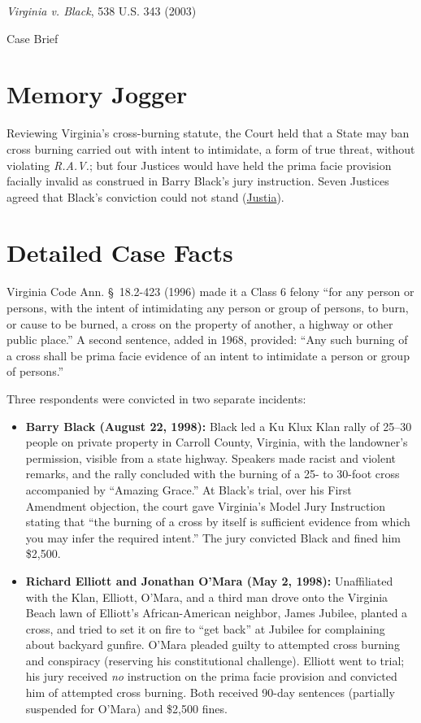 \documentclass[12pt]{article}
\begin{document}
\begin{center}
{\LARGE \textit{Virginia v. Black}, 538 U.S. 343 (2003)\par}
\vspace{0.8em}
{\large Case Brief\par}
\end{center}
\vspace{1em}

\section{Memory Jogger}
Reviewing Virginia's cross-burning statute, the Court held that a State may ban cross burning carried out with intent to intimidate, a form of true threat, without violating \textit{R.A.V.}; but four Justices would have held the prima facie provision facially invalid as construed in Barry Black's jury instruction. Seven Justices agreed that Black's conviction could not stand (\href{https://supreme.justia.com/cases/federal/us/538/343/}{Justia}).

\section{Detailed Case Facts}
Virginia Code Ann. \S~18.2-423 (1996) made it a Class 6 felony ``for any person or persons, with the intent of intimidating any person or group of persons, to burn, or cause to be burned, a cross on the property of another, a highway or other public place.'' A second sentence, added in 1968, provided: ``Any such burning of a cross shall be prima facie evidence of an intent to intimidate a person or group of persons.''

Three respondents were convicted in two separate incidents:
\begin{itemize}
  \item \textbf{Barry Black (August 22, 1998):} Black led a Ku Klux Klan rally of 25--30 people on private property in Carroll County, Virginia, with the landowner's permission, visible from a state highway. Speakers made racist and violent remarks, and the rally concluded with the burning of a 25- to 30-foot cross accompanied by ``Amazing Grace.'' At Black's trial, over his First Amendment objection, the court gave Virginia's Model Jury Instruction stating that ``the burning of a cross by itself is sufficient evidence from which you may infer the required intent.'' The jury convicted Black and fined him \$2,500.
  \item \textbf{Richard Elliott and Jonathan O'Mara (May 2, 1998):} Unaffiliated with the Klan, Elliott, O'Mara, and a third man drove onto the Virginia Beach lawn of Elliott's African-American neighbor, James Jubilee, planted a cross, and tried to set it on fire to ``get back'' at Jubilee for complaining about backyard gunfire. O'Mara pleaded guilty to attempted cross burning and conspiracy (reserving his constitutional challenge). Elliott went to trial; his jury received \textit{no} instruction on the prima facie provision and convicted him of attempted cross burning. Both received 90-day sentences (partially suspended for O'Mara) and \$2,500 fines.
\end{itemize}
\end{document}
